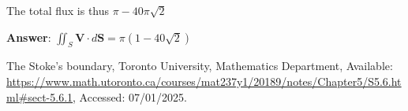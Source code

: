 \documentclass{article}
\begin{document}
The total flux is thus $\pi - 40\pi\sqrt{2}$

\textbf{Answer}: $\iint_S \mathbf{V} \cdot d\mathbf{S} =  \pi(1 - 40\sqrt{2})$
\begin{thebibliography}{99}

{The Stoke's boundary}, {Toronto University, Mathematics Department}, Available: \url{https://www.math.utoronto.ca/courses/mat237y1/20189/notes/Chapter5/S5.6.html#sect-5.6.1}, Accessed: 07/01/2025.
  
\end{thebibliography}
\end{document}
